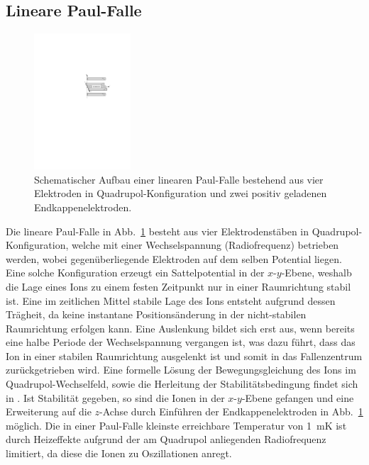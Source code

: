 \documentclass[twocolumn]{revtex4}
\begin{document}
\subsection{Lineare Paul-Falle}
\begin{figure}[h]
	\vspace{-0.4cm}
	\centering
	\includegraphics[width=0.32\textwidth]{./figures/lineare_paulfalle.pdf}
	\caption{Schematischer Aufbau einer linearen Paul-Falle  bestehend aus vier Elektroden in Quadrupol-Konfiguration und zwei positiv geladenen Endkappenelektroden.}
	\label{fig:paulfalle}
\end{figure}
Die lineare Paul-Falle in Abb.~\ref{fig:paulfalle} besteht aus vier Elektrodenstäben in Quadrupol-Konfiguration, welche mit einer Wechselspannung (Radiofrequenz) betrieben werden, wobei gegenüberliegende Elektroden auf dem selben Potential liegen.
Eine solche Konfiguration erzeugt ein Sattelpotential in der $x$-$y$-Ebene, weshalb die Lage eines Ions zu einem festen Zeitpunkt nur in einer Raumrichtung stabil ist.
Eine im zeitlichen Mittel stabile Lage des Ions entsteht aufgrund dessen Trägheit, da keine instantane Positionsänderung in der nicht-stabilen Raumrichtung erfolgen kann.
Eine Auslenkung bildet sich erst aus, wenn bereits eine halbe Periode der Wechselspannung vergangen ist, was dazu führt, dass das Ion in einer stabilen Raumrichtung ausgelenkt ist und somit in das Fallenzentrum zurückgetrieben wird.
Eine formelle Lösung der Bewegungsgleichung des Ions im Quadrupol-Wechselfeld, sowie die Herleitung der Stabilitätsbedingung findet sich in \cite{foot}.
Ist Stabilität gegeben, so sind die Ionen in der $x$-$y$-Ebene gefangen und eine Erweiterung auf die $z$-Achse durch Einführen der Endkappenelektroden in Abb.~\ref{fig:paulfalle} möglich.
Die in einer Paul-Falle kleinste erreichbare Temperatur von \SI{1}{mK} ist durch Heizeffekte aufgrund der am Quadrupol anliegenden Radiofrequenz limitiert, da diese die Ionen zu Oszillationen anregt.
\end{document}
